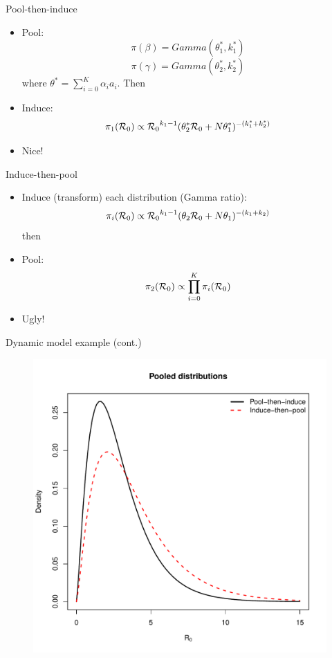 \begin{frame}{Pool-then-induce}
\begin{itemize}
 \item Pool:
 \[ \pi(\beta) = Gamma(\theta_{1}^*, k_{1}^*) \]
 \[ \pi(\gamma) = Gamma(\theta_{2}^*, k_{2}^*) \]
 where $\theta^* = \sum_{i= 0}^K \alpha_i a_i$. Then
\item Induce:
\[ \pi_{1}({\cal R}_0) \propto  {{\cal R}_0}^{k_1-1} (\theta_{2}^* {\cal R}_0 + N\theta_{1}^*)^{-(k_{1}^* +  k_{2}^*)}\]
\item Nice! 
\end{itemize}
\end{frame}
\begin{frame}{Induce-then-pool}
\begin{itemize}
 \item Induce (transform) each distribution (Gamma ratio):
 \[ \pi_{i}({\cal R}_0) \propto  {{\cal R}_0}^{k_1-1} (\theta_2 {\cal R}_0 + N\theta_1)^{-(k_1 + k_2)} \]
 then
\item Pool:
\[ \pi_{2}({\cal R}_0)  \propto \prod_{i = 0}^K \pi_{i}({\cal R}_0)\]
\item Ugly!
\end{itemize}
\end{frame}
\begin{frame}{Dynamic model example (cont.)}
 \begin{figure}
 \begin{center}
  \includegraphics[scale=0.4]{figures/ItP_vs_PtI_equalWeights.pdf}
 \end{center}
  \end{figure}
\end{frame}
